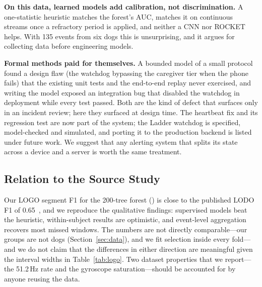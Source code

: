 \textbf{On this data, learned models add calibration, not discrimination.} A one-statistic heuristic matches the forest's AUC, matches it on continuous streams once a refractory period is applied, and neither a CNN nor ROCKET helps. With 135 events from six dogs this is unsurprising, and it argues for collecting data before engineering models.

\textbf{Formal methods paid for themselves.} A bounded model of a small protocol found a design flaw (the watchdog bypassing the caregiver tier when the phone fails) that the existing unit tests and the end-to-end replay never exercised, and writing the model exposed an integration bug that disabled the watchdog in deployment while every test passed. Both are the kind of defect that surfaces only in an incident review; here they surfaced at design time. The heartbeat fix and its regression test are now part of the system; the Ladder watchdog is specified, model-checked and simulated, and porting it to the production backend is listed under future work. We suggest that any alerting system that splits its state across a device and a server is worth the same treatment.

\subsection{Relation to the Source Study}
Our LOGO segment F1 for the 200-tree forest () is close to the published LODO F1 of 0.65~\cite{brady2025collar}, and we reproduce the qualitative findings: supervised models beat the heuristic, within-subject results are optimistic, and event-level aggregation recovers most missed windows. The numbers are not directly comparable---our groups are not dogs (Section~\ref{sec:data}), and we fit selection inside every fold---and we do not claim that the differences in either direction are meaningful given the interval widths in Table~\ref{tab:logo}. Two dataset properties that we report---the 51.2\,Hz rate and the gyroscope saturation---should be accounted for by anyone reusing the data.

